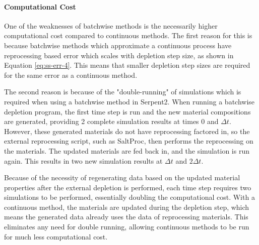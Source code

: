 

\paragraph*{Computational Cost}

One of the weaknesses of batchwise methods is the necessarily higher computational cost compared to continuous methods. The first reason for this is because batchwise methods which approximate a continuous process have reprocessing based error which scales with depletion step size, as shown in Equation \eqref{eq:ss-err-4}. This means that smaller depletion step sizes are required for the same error as a continuous method.

The second reason is because of the "double-running" of simulations which is required when using a batchwise method in Serpent2. When running a batchwise depletion program, the first time step is run and the new material compositions are generated, providing 2 complete simulation results at times 0 and $\Delta t$. However, these generated materials do not have reprocessing factored in, so the external reprocessing script, such as SaltProc, then performs the reprocessing on the materials. The updated materials are fed back in, and the simulation is run again. This results in two new simulation results at $\Delta t$ and $2 \Delta t$.

Because of the necessity of regenerating data based on the updated material properties after the external depletion is performed, each time step requires two simulations to be performed, essentially doubling the computational cost. With a continuous method, the materials are updated during the depletion step, which means the generated data already uses the data of reprocessing materials. This eliminates any need for double running, allowing continuous methods to be run for much less computational cost.

